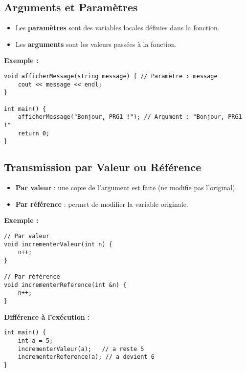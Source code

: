 \subsection{ Arguments et Paramètres}
\begin{itemize}
    \item Les \textbf{paramètres} sont des variables locales définies dans la fonction.
    \item Les \textbf{arguments} sont les valeurs passées à la fonction.
\end{itemize}

\textbf{Exemple :}
\begin{tcolorbox}[colframe=blue!50!black, colback=blue!5!white, title=Exemple d'Arguments et Paramètres]
\begin{verbatim}
void afficherMessage(string message) { // Paramètre : message
    cout << message << endl;
}

int main() {
    afficherMessage("Bonjour, PRG1 !"); // Argument : "Bonjour, PRG1 !"
    return 0;
}
\end{verbatim}
\end{tcolorbox}

\subsection{ Transmission par Valeur ou Référence}
\begin{itemize}
    \item \textbf{Par valeur} : une copie de l'argument est faite (ne modifie pas l'original).
    \item \textbf{Par référence} : permet de modifier la variable originale.
\end{itemize}

\textbf{Exemple :}
\begin{tcolorbox}[colframe=blue!50!black, colback=blue!5!white, title=Exemple de Transmission par Valeur ou Référence]
\begin{verbatim}
// Par valeur
void incrementerValeur(int n) {
    n++;
}

// Par référence
void incrementerReference(int &n) {
    n++;
}
\end{verbatim}
\end{tcolorbox}

\textbf{Différence à l'exécution :}
\begin{tcolorbox}[colframe=blue!50!black, colback=blue!5!white, title=Exemple de Différence à l'Exécution]
\begin{verbatim}
int main() {
    int a = 5;
    incrementerValeur(a);   // a reste 5
    incrementerReference(a); // a devient 6
}
\end{verbatim}
\end{tcolorbox}

